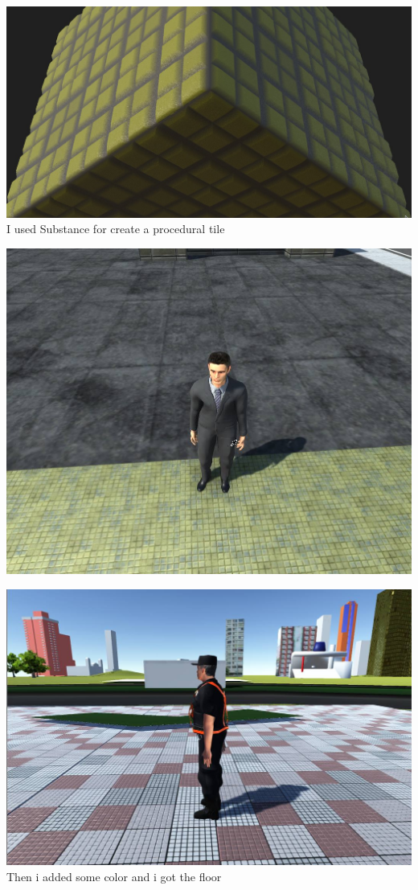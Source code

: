 \documentclass{article}
\begin{document}
  \includegraphics[width=\textwidth]{39.jpg}
  I used Substance for create a procedural tile
  
  \includegraphics[width=\textwidth]{40.jpg}
  
  \includegraphics[width=\textwidth]{41.jpg}
  Then i added some color and i got the floor
  
\end{document}
